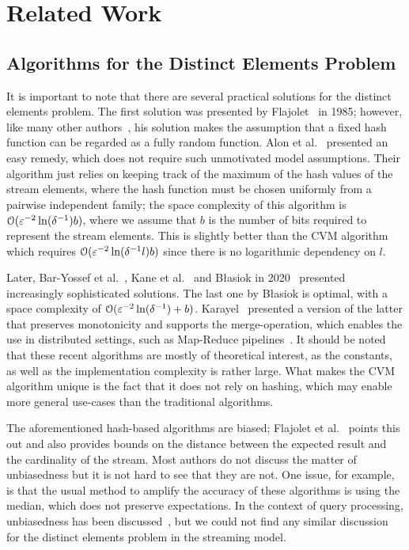 \section{Related Work}\label{sec:related_work}
\subsection{Algorithms for the Distinct Elements Problem}
It is important to note that there are several practical solutions for the distinct elements problem.
The first solution was presented by Flajolet~\cite{flajolet1985} in 1985; however, like many other authors~\cite{flajolet2007,heule2013,pettie2021}, his solution makes the assumption that a fixed hash function can be regarded as a fully random function.
Alon et al.~\cite[Section 2.3]{alon1999} presented an easy remedy, which does not require such unmotivated model assumptions.
Their algorithm just relies on keeping track of the maximum of the hash values of the stream elements, where the hash function must be chosen uniformly from a pairwise independent family; the space complexity of this algorithm is $\operatorname{\mathcal O}(\varepsilon^{-2} \ln (\delta^{-1}) b)$, where we assume that $b$ is the number of bits required to represent the stream elements.
This is slightly better than the CVM algorithm which requires $\operatorname{\mathcal O}(\varepsilon^{-2} \ln (\delta^{-1}l) b)$ since there is no logarithmic dependency on $l$.

Later, Bar-Yossef et al.~\cite{baryossef2002}, Kane et al.~\cite{kane2010} and B\l{}asiok in 2020~\cite{blasiok2020} presented increasingly sophisticated solutions.
The last one by B\l{}asiok is optimal, with a space complexity of $\operatorname{\mathcal O}(\varepsilon^{-2} \ln (\delta^{-1}) + b)$.
Karayel~\cite{karayel2023} presented a version of the latter that preserves monotonicity and supports the merge-operation, which enables the use in distributed settings, such as Map-Reduce pipelines~\cite{dean2010}.
It should be noted that these recent algorithms are mostly of theoretical interest, as the constants, as well as the implementation complexity is rather large.
What makes the CVM algorithm unique is the fact that it does not rely on hashing, which may enable more general use-cases than the traditional algorithms.

The aforementioned hash-based algorithms are biased; Flajolet et al.~\cite{flajolet1985} points this out and also provides bounds on the distance between the expected result and the cardinality of the stream.
Most authors do not discuss the matter of unbiasedness but it is not hard to see that they are not.
One issue, for example, is that the usual method to amplify the accuracy of these algorithms is using the median, which does not preserve expectations.
In the context of query processing, unbiasedness has been discussed~\cite[Section 2.1]{haas1995}, but we could not find any similar discussion for the distinct elements problem in the streaming model.

